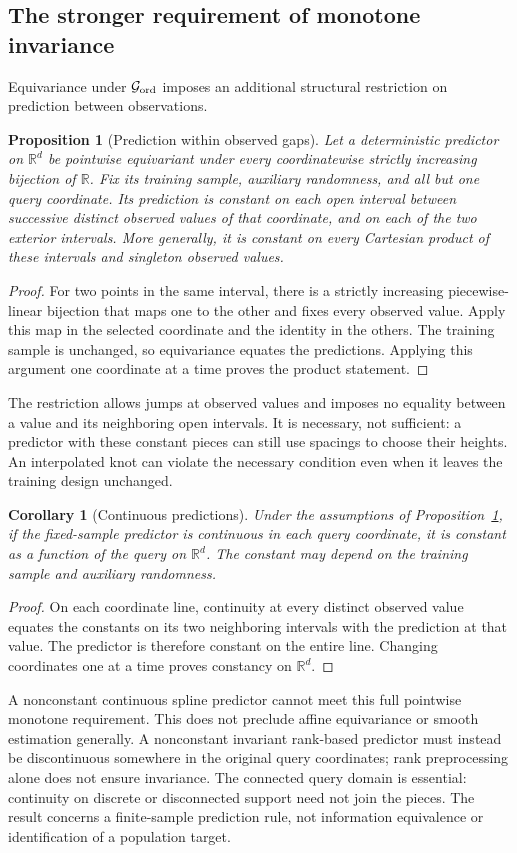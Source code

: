 \documentclass[11pt]{article}
\newtheorem{proposition}{Proposition}
\newtheorem{corollary}{Corollary}
\theoremstyle{definition}
\theoremstyle{remark}
\begin{document}
\subsection{The stronger requirement of monotone invariance}

Equivariance under $\mathcal G_{\rm ord}$ imposes an additional structural
restriction on prediction between observations.
\begin{proposition}[Prediction within observed gaps]\label{prop:ordinal-gaps}
Let a deterministic predictor on $\mathbb R^d$ be pointwise equivariant
under every coordinatewise strictly increasing bijection of $\mathbb R$.
Fix its training sample, auxiliary randomness, and all but one query
coordinate. Its prediction is constant on each open interval between
successive distinct observed values of that coordinate, and on each of
the two exterior intervals. More generally, it is constant on every
Cartesian product of these intervals and singleton observed values.
\end{proposition}
\begin{proof}
For two points in the same interval, there is a strictly increasing
piecewise-linear bijection that maps one to the other and fixes every
observed value. Apply this map in the selected coordinate and the identity
in the others. The training sample is unchanged, so equivariance equates
the predictions. Applying this argument one coordinate at a time proves
the product statement.
\end{proof}
The restriction allows jumps at observed values and imposes no equality
between a value and its neighboring open intervals. It is necessary, not
sufficient: a predictor with these constant pieces can still use spacings
to choose their heights. An interpolated knot can violate the necessary
condition even when it leaves the training design unchanged.

\begin{corollary}[Continuous predictions]\label{cor:continuous}
Under the assumptions of Proposition~\ref{prop:ordinal-gaps}, if the
fixed-sample predictor is continuous in each query coordinate, it is
constant as a function of the query on $\mathbb R^d$. The constant may
depend on the training sample and auxiliary randomness.
\end{corollary}
\begin{proof}
On each coordinate line, continuity at every distinct observed value
equates the constants on its two neighboring intervals with the prediction
at that value. The predictor is therefore constant on the entire line.
Changing coordinates one at a time proves constancy on $\mathbb R^d$.
\end{proof}
A nonconstant continuous spline predictor cannot meet this full pointwise
monotone requirement. This does not preclude affine equivariance or smooth
estimation generally. A nonconstant invariant rank-based predictor must
instead be discontinuous somewhere in the original query coordinates;
rank preprocessing alone does not ensure invariance. The connected query
domain is essential: continuity on discrete or disconnected support need
not join the pieces. The result concerns a finite-sample prediction rule,
not information equivalence or identification of a population target.
\end{document}
